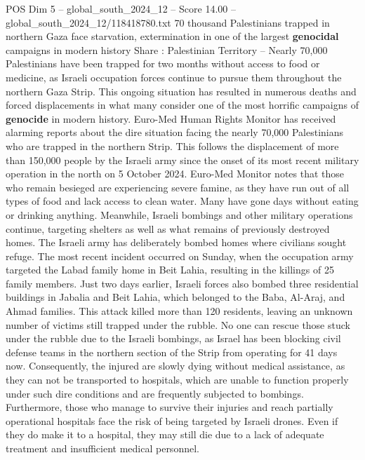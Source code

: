 \begin{textsample}{POS Dim 5 – global\_south\_2024\_12 – Score 14.00 – global\_south\_2024\_12/118418780.txt}  \label{ex:f5_pos_060}
70 thousand Palestinians trapped in northern Gaza face starvation, extermination in one of the largest \textbf{genocidal} campaigns in modern history Share : Palestinian Territory -- Nearly 70,000 Palestinians have been trapped for two months without access to food or medicine, as Israeli occupation forces continue to pursue them throughout the northern Gaza Strip.
This ongoing situation has resulted in numerous deaths and forced displacements in what many consider one of the most horrific campaigns of \textbf{genocide} in modern history.
Euro-Med Human Rights Monitor has received alarming reports about the dire situation facing the nearly 70,000 Palestinians who are trapped in the northern Strip.
This follows the displacement of more than 150,000 people by the Israeli army since the onset of its most recent military operation in the north on 5 October 2024.
Euro-Med Monitor notes that those who remain besieged are experiencing severe famine, as they have run out of all types of food and lack access to clean water.
Many have gone days without eating or drinking anything.
Meanwhile, Israeli bombings and other military operations continue, targeting shelters as well as what remains of previously destroyed homes.
The Israeli army has deliberately bombed homes where civilians sought refuge.
The most recent incident occurred on Sunday, when the occupation army targeted the Labad family home in Beit Lahia, resulting in the killings of 25 family members.
Just two days earlier, Israeli forces also bombed three residential buildings in Jabalia and Beit Lahia, which belonged to the Baba, Al-Araj, and Ahmad families.
This attack killed more than 120 residents, leaving an unknown number of victims still trapped under the rubble.
No one can rescue those stuck under the rubble due to the Israeli bombings, as Israel has been blocking civil defense teams in the northern section of the Strip from operating for 41 days now.
Consequently, the injured are slowly dying without medical assistance, as they can not be transported to hospitals, which are unable to function properly under such dire conditions and are frequently subjected to bombings.
Furthermore, those who manage to survive their injuries and reach partially operational hospitals face the risk of being targeted by Israeli drones.
Even if they do make it to a hospital, they may still die due to a lack of adequate treatment and insufficient medical personnel.

\end{textsample}
